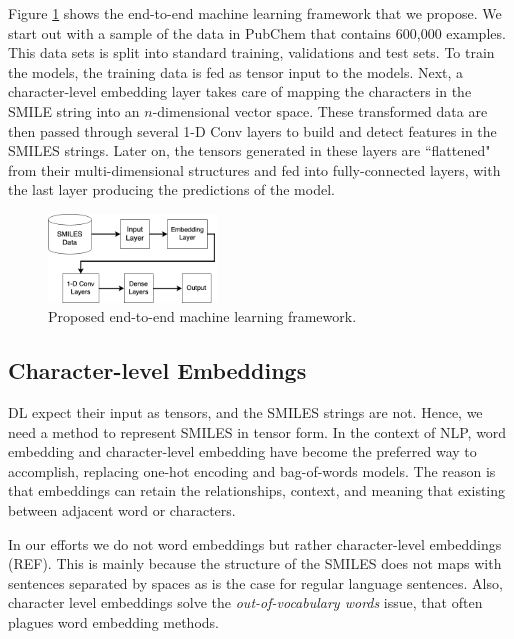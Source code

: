     
Figure \ref{fig:ml-framework} shows the end-to-end machine learning framework that we propose. We start out with a sample of the data in PubChem that contains 600,000 examples. This data sets is split into standard training, validations and test sets. To train the models, the training data is fed as tensor input to the models. Next, a character-level embedding layer takes care of mapping the characters in the SMILE string into an $n$-dimensional vector space. These transformed data are then passed through several 1-D Conv layers to build and detect features in the SMILES strings. Later on, the tensors generated in these layers are ``flattened" from their multi-dimensional structures and fed into fully-connected layers, with the last layer producing the predictions of the model.
    \begin{figure}[htbp]
        \centering
        \includegraphics[width=0.4\textwidth]{figures/1DConvArch.png}
        \caption{Proposed end-to-end machine learning framework.}
        \label{fig:ml-framework}
    \end{figure}
\subsection{Character-level Embeddings \label{embeddings}}
DL expect their input as tensors, and the SMILES strings are not. Hence, we need a method to represent SMILES in tensor form. In the context of NLP, word embedding and character-level embedding have become the preferred way to accomplish, replacing one-hot encoding and bag-of-words models. The reason is that embeddings can retain the relationships, context, and meaning that existing between adjacent word or characters. 

In our efforts we do not word embeddings but rather character-level embeddings (REF). This is mainly because the structure of the SMILES does not maps with sentences separated by spaces as is the case for regular language sentences. Also, character level embeddings solve the {\em out-of-vocabulary words} issue, that often plagues word embedding methods.

